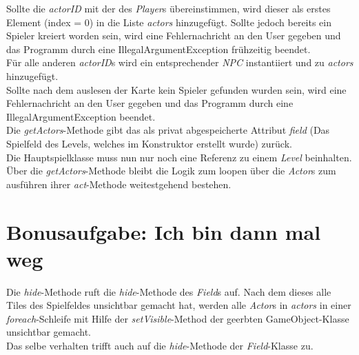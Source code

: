 \documentclass{pi1}
\begin{document}
\newpage

Sollte die \textit{actorID} mit der des \textit{Player}s übereinstimmen, wird dieser als erstes Element (index = 0) in die Liste \textit{actors} hinzugefügt. Sollte jedoch bereits ein Spieler kreiert worden sein, wird eine Fehlernachricht an den User gegeben und das Programm durch eine IllegalArgumentException frühzeitig beendet.\\
Für alle anderen \textit{actorID}s wird ein entsprechender \textit{NPC} instantiiert und zu \textit{actors} hinzugefügt.\\


Sollte nach dem auslesen der Karte kein Spieler gefunden wurden sein, wird eine Fehlernachricht an den User gegeben und das Programm durch eine IllegalArgumentException beendet.\\


Die \textit{getActors}-Methode gibt das als privat abgespeicherte Attribut \textit{field} (Das Spielfeld des Levels, welches im Konstruktor erstellt wurde) zurück.\\


Die Hauptspielklasse muss nun nur noch eine Referenz zu einem \textit{Level} beinhalten. Über die \textit{getActors}-Methode bleibt die Logik zum loopen über die \textit{Actor}s zum ausführen ihrer \textit{act}-Methode weitestgehend bestehen.

\newpage
\section{Bonusaufgabe: Ich bin dann mal weg}

Die \textit{hide}-Methode ruft die \textit{hide}-Methode des \textit{Field}s auf.
Nach dem dieses alle Tiles des Spielfeldes unsichtbar gemacht hat, werden alle \textit{Actor}s in \textit{actors} in einer \textit{foreach}-Schleife mit Hilfe der \textit{setVisible}-Method der geerbten GameObject-Klasse unsichtbar gemacht.\\


Das selbe verhalten trifft auch auf die \textit{hide}-Methode der \textit{Field}-Klasse zu.
\end{document}
